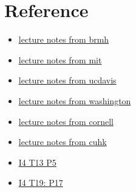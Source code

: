 \section{Reference}
\begin{itemize}
    \item \href{https://web.mat.bham.ac.uk/~malevao/MSM3P21/l14.pdf}{lecture notes from brmh}
    \item \href{https://ocw.mit.edu/courses/18-102-introduction-to-functional-analysis-spring-2021/resources/mit18_102s21_lec14/}{lecture notes from mit}
    \item \href{https://www.math.ucdavis.edu/%7Ehunter/book/ch6.pdf}{lecture notes from ucdavis}
    \item \href{https://sites.math.washington.edu/~burke/crs/555/555_notes/hilbert.pdf}{lecture notes from washington}
    \item \href{https://e.math.cornell.edu/people/belk/measuretheory/HilbertSpaces.pdf}{lecture notes from cornell}
    \item \href{https://www.math.cuhk.edu.hk/course_builder/1415/math5011/functional%20Analysis%202014.pdf}{lecture notes from cuhk}
    \item \href{https://personal.math.ubc.ca/~malabika/teaching/ubc/spring18/math421-510/HW3-Solution.pdf}{I4 T13 P5}
    \item \href{https://thichchaytron.files.wordpress.com/2013/10/functional-problems-anhle-full-www-mathvn-com.pdf}{I4 T19: P17}
\end{itemize}